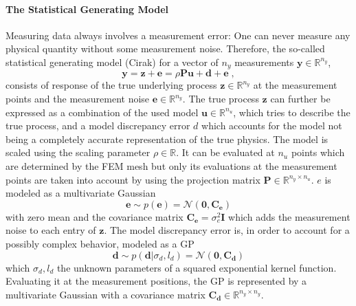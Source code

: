 \documentclass[%
  a4paper,oneside,%
  11pt,%
  smallchapters,
  green,%
  rgb, <cmyk>
  ,]{tubsbook}
\begin{document}
\paragraph{The Statistical Generating Model}
Measuring data always involves a measurement error: One can never measure any physical quantity without some measurement noise. Therefore, the so-called statistical generating model (Cirak) for a vector of $n_y$ measurements $\bm{y} \in \mathbb{R}^{n_y}$, 
%
\begin{equation}
\bm{y} = \bm{z} + \bm{e} = \rho \bm{P} \bm{u} + \bm{d} + \bm{e} \; ,
\end{equation}
%
consists of response of the true underlying process $\bm{z} \in \mathbb{R}^{n_y}$ at the measurement points and the measurement noise $\bm{e} \in \mathbb{R}^{n_y}$. The true process $\bm{z}$ can further be expressed as a combination of the used model $\bm{u} \in \mathbb{R}^{n_u}$, which tries to describe the true process, and a model discrepancy error $d$ which accounts for the model not being a completely accurate representation of the true physics. The model is scaled using the scaling parameter $\rho \in \mathbb{R}$. It can be evaluated at $n_u$ points which are determined by the FEM mesh but only its evaluations at the measurement points are taken into account by using the projection matrix $\bm{P} \in \mathbb{R}^{n_y \times n_u}$.
%
$e$ is modeled as a multivariate Gaussian 
%
\begin{equation}
\bm{e} \sim p(\bm{e}) = \mathcal{N}(\bm{0}, \bm{C_e})
\end{equation}
with zero mean and the covariance matrix $\bm{C_e} = \sigma_e^2 \bm{I}$ which adds the measurement noise to each entry of $\bm{z}$.
%
The model discrepancy error is, in order to account for a possibly complex behavior, modeled as a GP
\begin{equation}
\bm{d} \sim p(\bm{d} | \sigma_d, l_d) = \mathcal{N}(\bm{0},\bm{C_d})
\end{equation}
which $\sigma_d, l_d$ the unknown parameters of a squared exponential kernel function. Evaluating it at the measurement positions, the GP is represented by a multivariate Gaussian with a covariance matrix $\bm{C_d} \in \mathbb{R}^{n_y \times n_y}$.
\end{document}
